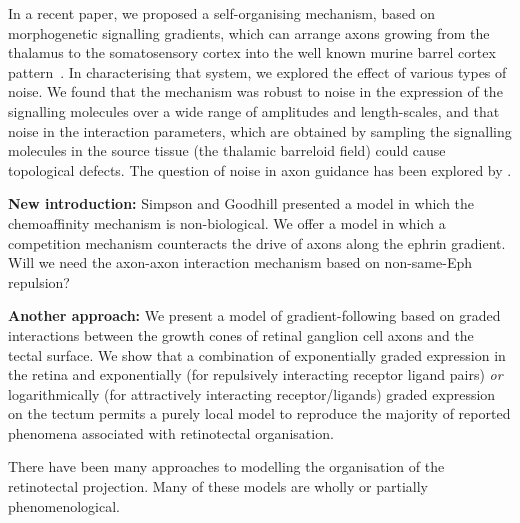 \documentclass[11pt, a4paper]{article}
\begin{document}


In a recent paper, we proposed a self-organising mechanism, based on
morphogenetic signalling gradients, which can arrange
axons growing from the thalamus to the somatosensory cortex into the well
known murine barrel cortex pattern~\citep{james_modelling_2020}. In
characterising that system, we explored the effect of various types of
noise. We found that the mechanism was robust to noise in the expression of
the signalling molecules over a wide range of amplitudes and length-scales,
and that noise in the interaction parameters, which are obtained by sampling
the signalling molecules in the source tissue (the thalamic barreloid field)
could cause topological defects. The question of noise in axon guidance has
been explored by \citet{goodhill_can_2016}.

\color{grey}
\textbf{New introduction:} Simpson and Goodhill presented a model in which the
chemoaffinity mechanism is non-biological. We offer a model in which a
competition mechanism counteracts the drive of axons along the ephrin
gradient. Will we need the axon-axon interaction mechanism based on
non-same-Eph repulsion?

\textbf{Another approach:} We present a model of gradient-following based on graded
interactions between the growth cones of retinal ganglion cell axons and the
tectal surface. We show that a combination of exponentially graded expression
in the retina \citep{reber_relative_2004} and exponentially (for repulsively
interacting receptor ligand pairs) \emph{or} logarithmically (for attractively
interacting receptor/ligands) graded expression on the tectum permits a purely
local model to reproduce the majority of reported phenomena associated with
retinotectal organisation.

There have been many approaches to modelling the organisation of the
retinotectal projection. Many of these models are wholly or partially
phenomenological.
\end{document}
